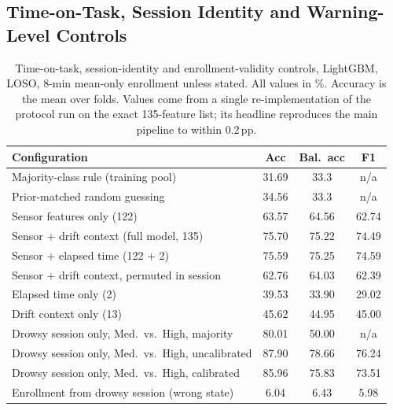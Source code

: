 \documentclass[journal]{IEEEtran}
\newcommand{\pp}{\,pp}
\begin{document}
\subsection{Time-on-Task, Session Identity and Warning-Level Controls}
\label{sec:controls2}
\begin{table}[!t]
\caption{Time-on-task, session-identity and enrollment-validity controls,
LightGBM, LOSO, 8-min mean-only enrollment unless stated. All values in \%.
Accuracy is the mean over folds. Values come from a single re-implementation of
the protocol run on the exact 135-feature list; its headline reproduces the main
pipeline to within 0.2\pp{}.}
\label{tab:controls2}
\centering\footnotesize
\setlength{\tabcolsep}{3pt}
\begin{tabular}{@{}lccc@{}}
\toprule
Configuration & Acc & Bal.\ acc & F1 \\
\midrule
Majority-class rule (training pool)               & 31.69 & 33.3 & n/a \\
Prior-matched random guessing                     & 34.56 & 33.3 & n/a \\
Sensor features only (122)                        & 63.57 & 64.56 & 62.74 \\
Sensor + drift context (full model, 135)          & 75.70 & 75.22 & 74.49 \\
Sensor + elapsed time (122 + 2)                   & 75.59 & 75.25 & 74.59 \\
Sensor + drift context, permuted in session       & 62.76 & 64.03 & 62.39 \\
Elapsed time only (2)                             & 39.53 & 33.90 & 29.02 \\
Drift context only (13)                           & 45.62 & 44.95 & 45.00 \\
\midrule
Drowsy session only, Med.\ vs.\ High, majority     & 80.01 & 50.00 & n/a \\
Drowsy session only, Med.\ vs.\ High, uncalibrated & 87.90 & 78.66 & 76.24 \\
Drowsy session only, Med.\ vs.\ High, calibrated   & 85.96 & 75.83 & 73.51 \\
Enrollment from drowsy session (wrong state)      & 6.04 & 6.43 & 5.98 \\
\bottomrule
\end{tabular}
\end{table}
\end{document}
